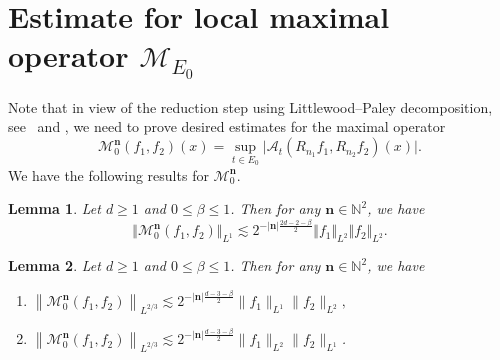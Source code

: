 \documentclass[a4paper,reqno]{amsart}
\newtheorem{lemma}{Lemma}[section]
\numberwithin{equation}{section}
\newcommand{\N}{{\mathbb N}}
\begin{document}
	\section{Estimate for local maximal operator $\mathcal M_{E_0}$}\label{local}
	Note that in view of the reduction step using Littlewood--Paley decomposition, see~ and , we need to prove desired estimates for the maximal operator 
	\[\mathcal{M}^{\mathbf{n}}_0(f_1,f_2)(x)=\sup_{t\in E_0}\Big|\mathcal{A}_{t}(R_{n_1}f_1,R_{n_2}f_2)(x)\Big|.\]
	We have the following results for $\mathcal{M}^{\mathbf{n}}_0$.
	\begin{lemma}\label{l2}
		Let $d\geq1$ and $0\leq \beta\leq1$. Then for any $\mathbf{n}\in\N^2$, we have
		$$\Vert \mathcal{M}^{\mathbf{n}}_0(f_1,f_2)\Vert_{L^1}\lesssim 2^{-|\mathbf{n}|\frac{2d-2-\beta}{2}}\Vert f_1\Vert_{L^2}\Vert f_2\Vert_{L^2}.$$
	\end{lemma}
	\begin{lemma}\label{l2/3}
		Let $d\geq 1$ and $0\leq \beta\leq1$. Then for any $\mathbf{n}\in\N^2$, we have
		\begin{enumerate}
			\item $\left\|\mathcal{M}^{\mathbf{n}}_0(f_1,f_2)\right\|_{L^{2/3}}\lesssim2^{-|\mathbf{n}|\frac{d-3-\beta}{2}}\|f_1\|_{L^1}\|f_2\|_{L^2},$
			\item $\left\|\mathcal{M}^{\mathbf{n}}_0(f_1,f_2)\right\|_{L^{2/3}}\lesssim2^{-|\mathbf{n}|\frac{d-3-\beta}{2}}\|f_1\|_{L^2}\|f_2\|_{L^1}$.
		\end{enumerate}
	\end{lemma}
	
\end{document}
